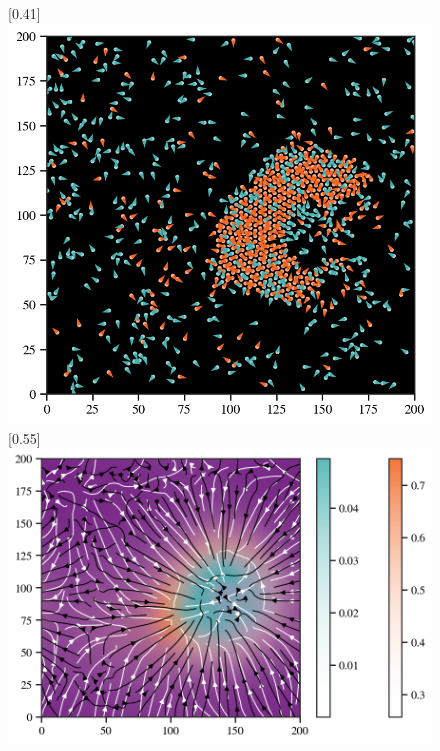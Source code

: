 \documentclass{article}
\begin{document}
\begin{figure}[htbp]
    \centering
    [0.41\linewidth]{
      \includegraphics[width=\linewidth]{figs/particle.png}
    }
    \hfill
    [0.55\linewidth]{
      \includegraphics[width=\linewidth]{figs/streamplot.png}
    }
\end{figure}
\end{document}
